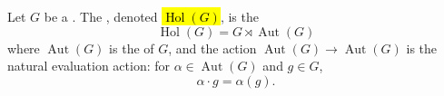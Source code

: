\begin{definition} \label{definition:holomorph_of_a_group}
    Let $G$ be a . The , denoted \hl{$\operatorname{Hol}(G)$}, is the 
    $$\operatorname{Hol}(G) = G \rtimes \operatorname{Aut}(G)$$
    where $\operatorname{Aut}(G)$ is the  of $G$, and the action $\operatorname{Aut}(G) \to \operatorname{Aut}(G)$ is the natural evaluation action: for $\alpha \in \operatorname{Aut}(G)$ and $g \in G$,
    $$\alpha \cdot g = \alpha(g).$$
\end{definition}
